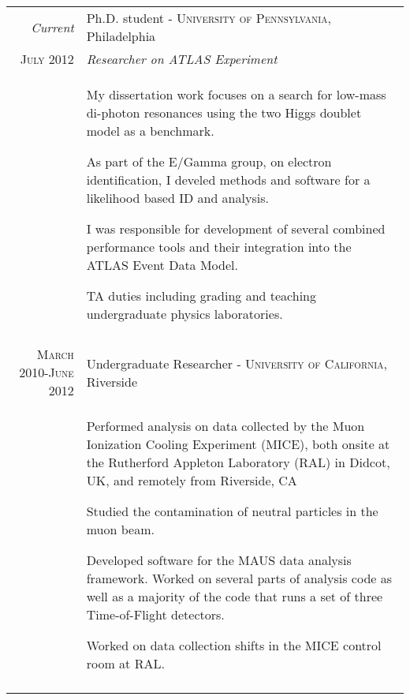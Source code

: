 \documentclass[a4paper,10pt]{article} %
\begin{document}
\begin{longtable}{r|p{11cm}}
\emph{Current}    & Ph.D. student - \textsc{University of Pennsylvania}, Philadelphia \\
\textsc{July 2012} & \emph{Researcher on ATLAS Experiment}\\
				   & \begin{itemize}
					 \footnotesize{
						\item My dissertation work focuses on a search for low-mass di-photon resonances using the two Higgs doublet model as a benchmark.
						\item As part of the E/Gamma group, on electron identification, I develed methods and software for a likelihood based ID and analysis.
						\item I was responsible for development of several combined performance tools and their integration into the ATLAS Event Data Model.
						\item TA duties including grading and teaching undergraduate physics laboratories.
					 }
					 \end{itemize} \\
\multicolumn{2}{c}{} \\


\textsc{March 2010-June 2012} & Undergraduate Researcher - \textsc{University of California}, Riverside \emph{}\\
				  & \begin{itemize}
					\footnotesize{
						\item Performed analysis on data collected by the Muon Ionization Cooling Experiment (MICE), both onsite at the Rutherford Appleton Laboratory (RAL) in Didcot, UK, and remotely from Riverside, CA
						\item Studied the contamination of neutral particles in the muon beam.
					    \item Developed software for the MAUS data analysis framework.  Worked on several parts of analysis code as well as a majority of the code that runs a set of three Time-of-Flight detectors.
						\item Worked on data collection shifts in the MICE control room at RAL.
					}
			        \end{itemize} \\
\multicolumn{2}{c}{} \\


\end{longtable}
\end{document}
